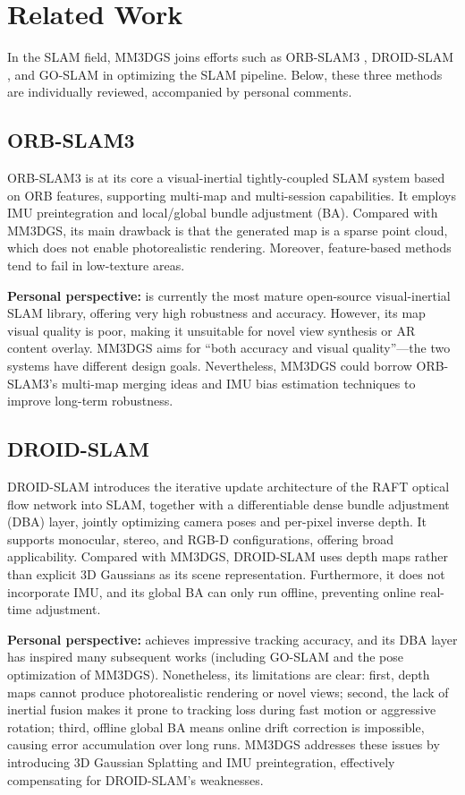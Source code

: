 \documentclass[12pt,a4paper,onecolumn]{article}
\begin{document}
\section{Related Work}
In the SLAM field, MM3DGS joins efforts such as ORB-SLAM3 \citep{ORB-SLAM3}, DROID-SLAM \citep{DROID-SLAM}, and GO-SLAM \citep{GO-SLAM} in optimizing the SLAM pipeline. Below, these three methods are individually reviewed, accompanied by personal comments.

\subsection{ORB-SLAM3 \citep{ORB-SLAM3}}
ORB-SLAM3 is at its core a visual-inertial tightly-coupled SLAM system based on ORB features, supporting multi-map and multi-session capabilities. It employs IMU preintegration and local/global bundle adjustment (BA). Compared with MM3DGS, its main drawback is that the generated map is a sparse point cloud, which does not enable photorealistic rendering. Moreover, feature-based methods tend to fail in low-texture areas.

\textbf{Personal perspective:} \citet{ORB-SLAM3} is currently the most mature open-source visual-inertial SLAM library, offering very high robustness and accuracy. However, its map visual quality is poor, making it unsuitable for novel view synthesis or AR content overlay. MM3DGS aims for ``both accuracy and visual quality''—the two systems have different design goals. Nevertheless, MM3DGS could borrow ORB-SLAM3's multi-map merging ideas and IMU bias estimation techniques to improve long-term robustness.

\subsection{DROID-SLAM \citep{DROID-SLAM}}
DROID-SLAM introduces the iterative update architecture of the RAFT optical flow network into SLAM, together with a differentiable dense bundle adjustment (DBA) layer, jointly optimizing camera poses and per-pixel inverse depth. It supports monocular, stereo, and RGB-D configurations, offering broad applicability. Compared with MM3DGS, DROID-SLAM uses depth maps rather than explicit 3D Gaussians as its scene representation. Furthermore, it does not incorporate IMU, and its global BA can only run offline, preventing online real-time adjustment.

\textbf{Personal perspective:} \citet{DROID-SLAM} achieves impressive tracking accuracy, and its DBA layer has inspired many subsequent works (including GO-SLAM and the pose optimization of MM3DGS). Nonetheless, its limitations are clear: first, depth maps cannot produce photorealistic rendering or novel views; second, the lack of inertial fusion makes it prone to tracking loss during fast motion or aggressive rotation; third, offline global BA means online drift correction is impossible, causing error accumulation over long runs. MM3DGS addresses these issues by introducing 3D Gaussian Splatting and IMU preintegration, effectively compensating for DROID-SLAM's weaknesses.
\end{document}
